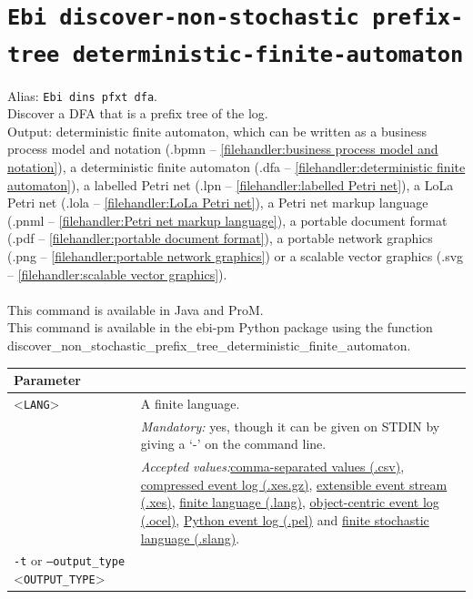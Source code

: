 {\clearpage\section{\texttt{Ebi discover-non-stochastic prefix-tree deterministic-finite-automaton}}
\label{command:Ebi discover-non-stochastic prefix-tree deterministic-finite-automaton}
Alias: \texttt{Ebi dins pfxt dfa}.\\
Discover a DFA that is a prefix tree of the log.\\
\noindent Output: deterministic finite automaton, which can be written as a business process model and notation (.bpmn -- \cref{filehandler:business process model and notation}), a deterministic finite automaton (.dfa -- \cref{filehandler:deterministic finite automaton}), a labelled Petri net (.lpn -- \cref{filehandler:labelled Petri net}), a LoLa Petri net (.lola -- \cref{filehandler:LoLa Petri net}), a Petri net markup language (.pnml -- \cref{filehandler:Petri net markup language}), a portable document format (.pdf -- \cref{filehandler:portable document format}), a portable network graphics (.png -- \cref{filehandler:portable network graphics}) or a scalable vector graphics (.svg -- \cref{filehandler:scalable vector graphics}).\\
\\This command is available in Java and ProM.
\\This command is available in the ebi-pm Python package using the function discover\_non\_stochastic\_prefix\_tree\_deterministic\_finite\_automaton.
\begin{tabularx}{\linewidth}{lX}
\toprule
Parameter \\\midrule
<\texttt{LANG}>&A finite language.\\
&\textit{Mandatory:} \quad yes, though it can be given on STDIN by giving a `-' on the command line.\\
&\textit{Accepted values:}\quad \hyperref[filehandler:comma-separated values]{comma-separated values (.csv)}, \hyperref[filehandler:compressed event log]{compressed event log (.xes.gz)}, \hyperref[filehandler:extensible event stream]{extensible event stream (.xes)}, \hyperref[filehandler:finite language]{finite language (.lang)}, \hyperref[filehandler:object-centric event log]{object-centric event log (.ocel)}, \hyperref[filehandler:Python event log]{Python event log (.pel)} and \hyperref[filehandler:finite stochastic language]{finite stochastic language (.slang)}.\\
\texttt{-t} or \texttt{--output\_type} <\texttt{OUTPUT\_TYPE}> &

\end{tabularx}}
